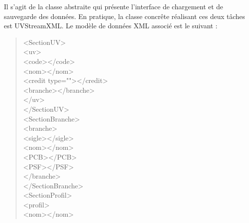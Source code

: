 \documentclass[a4paper,10pt,french]{report}
\begin{document}
		Il s'agit de la classe abstraite qui présente l'interface de chargement et de sauvegarde des données.
		En pratique, la classe concrête réalisant ces deux tâches est UVStreamXML. Le modèle de données XML associé est le suivant :
		\begin{quote}

<SectionUV>\\
	\hspace*{1cm}<uv>\\
	\hspace*{1cm}	\hspace*{1cm}<code></code>\\
	\hspace*{1cm}	</nom>\\
	\hspace*{1cm}\hspace*{1cm}	<credit type=""></credit>\\
	\hspace*{1cm}\hspace*{1cm}	<branche></branche>\\
	\hspace*{1cm}</uv>\\
</SectionUV>\\
<SectionBranche>\\
	\hspace*{1cm}<branche>\\
	\hspace*{1cm}\hspace*{1cm}	<sigle></sigle>\\
	\hspace*{1cm}\hspace*{1cm}	<nom></nom>\\
	\hspace*{1cm}\hspace*{1cm}	<PCB></PCB>\\
	\hspace*{1cm}\hspace*{1cm}	<PSF></PSF>\\
	\hspace*{1cm}</branche>\\
</SectionBranche>\\
<SectionProfil>\\
	\hspace*{1cm}<profil>\\
	\hspace*{1cm}\hspace*{1cm}	<nom></nom>		\\

\end{quote}
\end{document}
